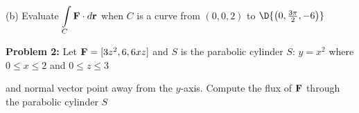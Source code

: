 \documentclass[12pt]{amsart}
\numberwithin{equation}{section}
\begin{document}

\vspace{15.4cm}

(b) Evaluate $\displaystyle{\int \limits_{C} \text{\bf F} \cdot  d\text{\bf r}}$ when $C$ is a curve from $(0,0,2)$ to $\D{\left(0,\frac{3\pi}{2},-6\right)}$

\thispagestyle{empty}
\newpage
\thispagestyle{empty}

{\bf Problem 2:} Let ${\bf F} = [3z^2, 6, 6xz]$ and $S$ is the parabolic cylinder $S:\, y=x^2$ where $0 \le x \le 2$ and $0 \le z \le 3$ 

and normal vector point away from the $y$-axis.
Compute the flux of ${\bf F}$ through the parabolic cylinder $S$

\thispagestyle{empty}
\newpage
\thispagestyle{empty}
\end{document}

